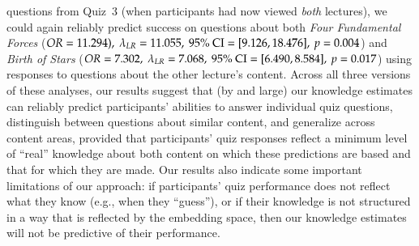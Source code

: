 \documentclass[10pt]{article}
\begin{document}
questions from Quiz~3 (when participants had now viewed \textit{both}
lectures), we could again reliably predict success on questions about both
\textit{Four Fundamental Forces} ($OR = 11.294),\ \lambda_{LR} = 11.055,\ 95\%\
\textnormal{CI} = [9.126, 18.476],\ p = 0.004$) and \textit{Birth of Stars}
($OR = 7.302,\ \lambda_{LR} = 7.068,\ 95\%\ \textnormal{CI} = [6.490, 8.584],\
p = 0.017$) using responses to questions about the other lecture's content.
Across all three versions of these analyses, our results suggest that (by and
large) our knowledge estimates can reliably predict participants' abilities to
answer individual quiz questions, distinguish between questions about similar
content, and generalize across content areas, provided that participants' quiz
responses reflect a minimum level of ``real'' knowledge about both content on
which these predictions are based and that for which they are made. Our results
also indicate some important limitations of our approach: if participants' quiz
performance does not reflect what they know (e.g., when they ``guess''), or if
their knowledge is not structured in a way that is reflected by the embedding
space, then our knowledge estimates will not be predictive of their
performance.


\end{document}
